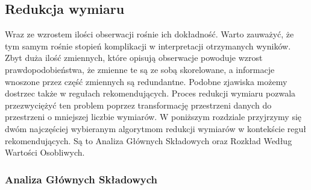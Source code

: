 \documentclass[12pt,a4paper]{report}
\begin{document}
\subsection{Redukcja wymiaru}
Wraz ze wzrostem ilości obserwacji rośnie ich dokładność. Warto zauważyć, że tym samym rośnie stopień komplikacji w interpretacji otrzymanych wyników. Zbyt duża ilość zmiennych, które opisują obserwacje powoduje wzrost prawdopodobieństwa, że zmienne te są ze sobą skorelowane, a informacje wnoszone przez część zmiennych są redundantne. Podobne zjawiska możemy dostrzec także w regułach rekomendujących. Proces redukcji wymiaru pozwala przezwyciężyć ten problem poprzez transformację przestrzeni danych do przestrzeni o mniejszej liczbie wymiarów. W poniższym rozdziale przyjrzymy się dwóm najczęściej wybieranym algorytmom redukcji wymiarów w kontekście reguł rekomendujących. Są to Analiza Głównych Składowych oraz Rozkład Według Wartości Osobliwych.

\subsubsection{Analiza Głównych Składowych}
\end{document}

